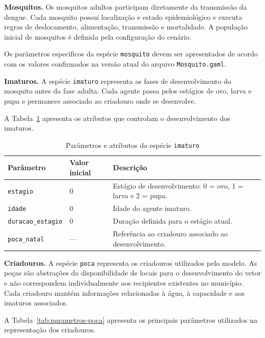 \textbf{Mosquitos.} Os mosquitos adultos participam diretamente da transmissão da dengue. Cada mosquito possui localização e estado epidemiológico e executa regras de deslocamento, alimentação, transmissão e mortalidade. A população inicial de mosquitos é definida pela configuração do cenário.

Os parâmetros específicos da espécie \texttt{mosquito} devem ser apresentados de acordo com os valores confirmados na versão atual do arquivo \texttt{Mosquito.gaml}.

\textbf{Imaturos.} A espécie \texttt{imaturo} representa as fases de desenvolvimento do mosquito antes da fase adulta. Cada agente passa pelos estágios de ovo, larva e pupa e permanece associado ao criadouro onde se desenvolve.

A Tabela~\ref{tab:parametros-imaturo} apresenta os atributos que controlam o desenvolvimento dos imaturos.

\begin{table}[htb]
    \centering
    \caption{Parâmetros e atributos da espécie \texttt{imaturo}}
    \label{tab:parametros-imaturo}
    \begin{tabular}{p{4.2cm} p{2.5cm} p{6.0cm}}
        \hline
        \textbf{Parâmetro} & \textbf{Valor inicial} & \textbf{Descrição} \\
        \hline
        \texttt{estagio} & 0 & Estágio de desenvolvimento: 0 = ovo, 1 = larva e 2 = pupa. \\
        \texttt{idade} & 0 & Idade do agente imaturo. \\
        \texttt{duracao\_estagio} & 0 & Duração definida para o estágio atual. \\
        \texttt{poca\_natal} & --- & Referência ao criadouro associado ao desenvolvimento. \\
        \hline
    \end{tabular}
\end{table}

\textbf{Criadouros.} A espécie \texttt{poca} representa os criadouros utilizados pelo modelo. As poças são abstrações da disponibilidade de locais para o desenvolvimento do vetor e não correspondem individualmente aos recipientes existentes no município. Cada criadouro mantém informações relacionadas à água, à capacidade e aos imaturos associados.

A Tabela~\ref{tab:parametros-poca} apresenta os principais parâmetros utilizados na representação dos criadouros.

